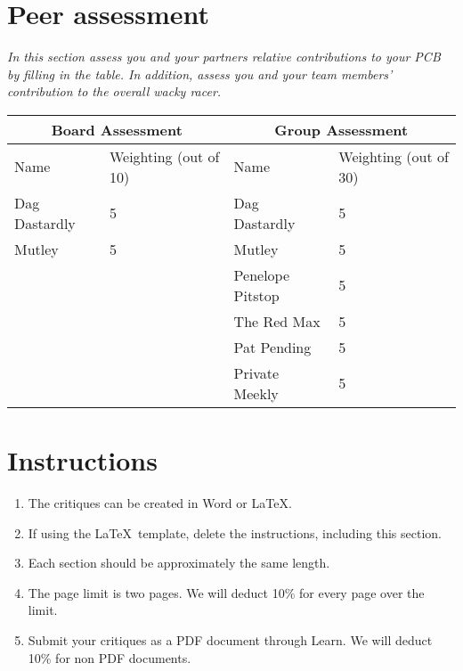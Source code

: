 \documentclass[a4paper,12pt]{article}
\begin{document}
\section{Peer assessment}

\emph{In this section assess you and your partners relative
  contributions to your PCB by filling in the table.  In addition,
  assess you and your team members' contribution to the overall wacky
  racer.}

\begin{tabular}{|l|l||l|l|}
\hline
\multicolumn{2}{|c||}{Board Assessment} & \multicolumn{2}{c|}{Group Assessment} \\
\hline
Name           & Weighting (out of 10) & Name           & Weighting (out of 30) \\
\hline \hline
Dag Dastardly  & 5            & Dag Dastardly    & 5     \\ \hline
Mutley         & 5            & Mutley           & 5     \\ \hline
               &              & Penelope Pitstop & 5     \\ \cline{3-4}
               &              & The Red Max      & 5     \\ \cline{3-4}
               &              & Pat Pending      & 5     \\ \cline{3-4}
               &              & Private Meekly   & 5     \\ \hline
\end{tabular}

\section*{Instructions}

\begin{enumerate}
\item The critiques can be created in Word or \LaTeX. 

\item If using the \LaTeX\ template, delete the instructions,
  including this section.

\item Each section should be approximately the same length.

\item The page limit is two pages.  We will deduct 10\% for every page
  over the limit.

\item Submit your critiques as a PDF document through Learn.  We will
  deduct 10\% for non PDF documents.
\end{enumerate}
\end{document}
